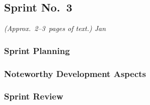 
\subsection{Sprint No.~3}

\emph{(Approx.~2--3~pages of text.) Jan}

\subsubsection*{Sprint Planning}

\subsubsection*{Noteworthy Development Aspects}

\subsubsection*{Sprint Review}


